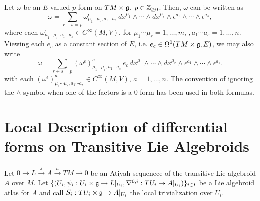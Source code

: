 \begin{proposition}\label{TheoremDecompOfVectorValuedFormsTLAEpsilonsDxs}
Let $\omega$ be an $E$-valued $p$-form on $TM \times \mathfrak{g}$, $p \in \mathbb{Z}_{\geq 0}$. Then, $\omega$ can be written as
\begin{equation}
    \omega = \sum_{r + s = p} \omega^\epsilon_{\mu_1 \cdots \mu_r, a_1 \cdots a_s}\, dx^{\mu_1} \wedge \cdots \wedge dx^{\mu_r} \wedge \epsilon^{a_1} \wedge \cdots \wedge \epsilon^{a_s},
\end{equation}
where each $\omega^\epsilon_{\mu_1 \cdots \mu_r, a_1 \cdots a_s} \in C^\infty(M, V)$, for $\mu_1 \cdots \mu_r = 1, \dots, m$, $, a_1 \cdots a_s = 1, \dots, n$. Viewing each $e_c$ as a constant section of $E$, i.e. $e_c \in \Omega^0(TM \times \mathfrak{g}, E)$, we may also write
\begin{equation}
    \omega = \sum_{r + s = p} \left(\omega^\epsilon\right)^c_{\mu_1 \cdots \mu_r, a_1 \cdots a_s}\, e_c \, dx^{\mu_1} \wedge \cdots \wedge dx^{\mu_r} \wedge \epsilon^{a_1} \wedge \cdots \wedge \epsilon^{a_s}.
\end{equation} 
with each $\left(\omega^\epsilon\right)^a_{\mu_1 \cdots \mu_r, a_1 \cdots a_s} \in C^\infty(M, V)$, $a = 1, \dots, n$.
The convention of ignoring the $\wedge$ symbol when one of the factors is a $0$-form has been used in both formulas.
\end{proposition}

\section{Local Description of differential forms on Transitive Lie Algebroids}

Let $0 \to L \xrightarrow{j} A \xrightarrow{a} TM \to 0$ be an Atiyah sequenece of the transitive Lie algebroid $A$ over $M$. Let $\{(U_i, \psi_i: U_i \times \mathfrak{g} \to L|_{U_i}, \nabla^{0, i}: TU_i \to A|_{U_i})\}_{i \in I}$ be a Lie algebroid atlas for $A$ and call $S_i: TU_i \times \mathfrak{g} \to A|_{U_i}$ the local trivialization over $U_i$.

